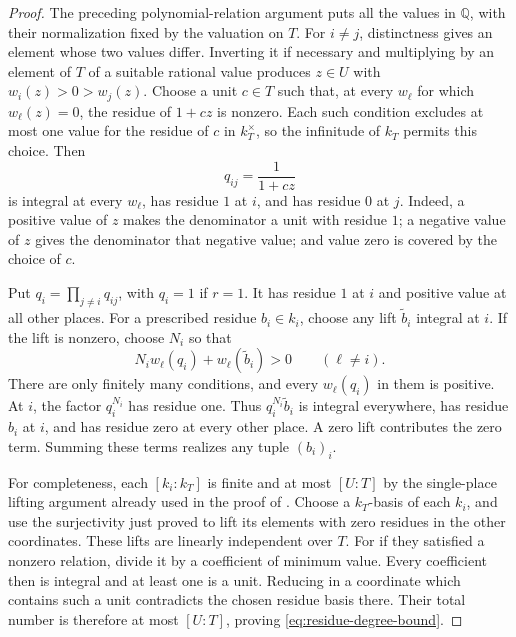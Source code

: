\begin{proof}
The preceding polynomial-relation argument puts all the values in
$\mathbb Q$, with their normalization fixed by the valuation on $T$.
For $i\ne j$, distinctness gives an element whose two values differ.
Inverting it if necessary and multiplying by an element of $T$ of a
suitable rational value produces $z\in U$ with
$w_i(z)>0>w_j(z)$.
Choose a unit $c\in T$ such that, at every $w_\ell$ for which
$w_\ell(z)=0$, the residue of $1+cz$ is nonzero.
Each such condition excludes at most one value for the residue of $c$
in $k_T^\times$, so the infinitude of $k_T$ permits this choice.
Then
\[
                         q_{ij}=\frac{1}{1+cz}
\]
is integral at every $w_\ell$, has residue $1$ at $i$, and has residue
$0$ at $j$.  Indeed, a positive value of $z$ makes the denominator a
unit with residue $1$; a negative value of $z$ gives the denominator
that negative value; and value zero is covered by the choice of $c$.

Put $q_i=\prod_{j\ne i}q_{ij}$, with $q_i=1$ if $r=1$.
It has residue $1$ at $i$ and positive value at all other places.
For a prescribed residue $b_i\in k_i$, choose any lift $\widetilde b_i$
integral at $i$. If the lift is nonzero, choose $N_i$ so that
\[
 N_iw_\ell(q_i)+w_\ell(\widetilde b_i)>0
 \qquad(\ell\ne i).
\]
There are only finitely many conditions, and every $w_\ell(q_i)$ in
them is positive. At $i$, the factor $q_i^{N_i}$ has residue one.
Thus $q_i^{N_i}\widetilde b_i$ is integral everywhere, has residue
$b_i$ at $i$, and has residue zero at every other place. A zero lift
contributes the zero term. Summing these terms realizes any tuple $(b_i)_i$.

For completeness, each $[k_i:k_T]$ is finite and at most $[U:T]$ by the
single-place lifting argument already used in the proof of
.  Choose a $k_T$-basis of each $k_i$, and use the
surjectivity just proved to lift its elements with zero residues in the
other coordinates.  These lifts are linearly independent over $T$.
For if they satisfied a nonzero relation, divide it by a coefficient
of minimum value.  Every coefficient then is integral and at least one
is a unit.  Reducing in a coordinate which contains such a unit
contradicts the chosen residue basis there.  Their total number is
therefore at most $[U:T]$, proving \eqref{eq:residue-degree-bound}.
\end{proof}

